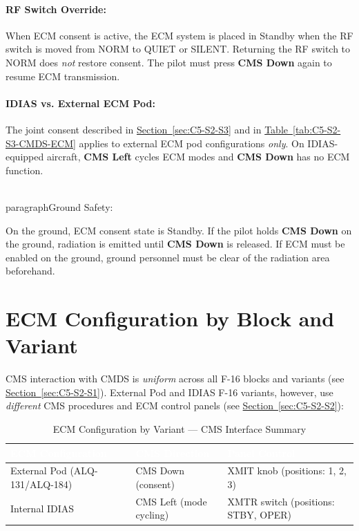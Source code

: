 \documentclass[11pt, a4paper, twoside]{report}
\newcommand{\secref}[1]{\hyperref[#1]{Section~\ref*{#1}}}
\newcommand{\tabref}[1]{\hyperref[#1]{Table~\ref*{#1}}}
\begin{document}
\paragraph{RF Switch Override:}

When ECM consent is active, the ECM system is placed in Standby when the RF switch is moved from NORM to QUIET or SILENT. Returning the RF switch to NORM does \textit{not} restore consent. The pilot must press \textbf{CMS Down} again to resume ECM transmission.

\paragraph{IDIAS vs. External ECM Pod:}

The joint consent described in \secref{sec:C5-S2-S3} and in \tabref{tab:C5-S2-S3-CMDS-ECM} applies to external ECM pod configurations \textit{only}. On IDIAS-equipped aircraft, \textbf{CMS Left} cycles ECM modes and \textbf{CMS Down} has no ECM function.

\\paragraph{Ground Safety:}

On the ground, ECM consent state is Standby. If the pilot holds \textbf{CMS Down} on the ground, radiation is emitted until \textbf{CMS Down} is released. If ECM must be enabled on the ground, ground personnel must be clear of the radiation area beforehand.

\section{ECM Configuration by Block and Variant}
\label{sec:C5-S3}

CMS interaction with CMDS is \textit{uniform} across all F-16 blocks and variants (see \secref{sec:C5-S2-S1}). External Pod and IDIAS F-16 variants, however, use \textit{different} CMS procedures and ECM control panels (see \secref{sec:C5-S2-S2}):

\begin{table}[H]
\centering
\caption{ECM Configuration by Variant --- CMS Interface Summary}
\label{tab:C5-S3-ecm-config-summary}
\small
\renewcommand{\arraystretch}{1.25}
\begin{tabular}{|>{\raggedright\arraybackslash}p{3.6cm}|>{\raggedright\arraybackslash}p{3.6cm}|>{\raggedright\arraybackslash}p{4.6cm}|}
\hline
\rowcolor{headerblue}
\textcolor{white}{\textbf{ECM Configuration}} & \textcolor{white}{\textbf{CMS Direction}} & \textcolor{white}{\textbf{Panel Control}} \\
\hline
External Pod (ALQ-131/ALQ-184) & CMS Down (consent) & XMIT knob (positions: 1, 2, 3) \\
\hline
Internal IDIAS & CMS Left (mode cycling) & XMTR switch (positions: STBY, OPER) \\
\hline
\end{tabular}
\end{table}
\end{document}
